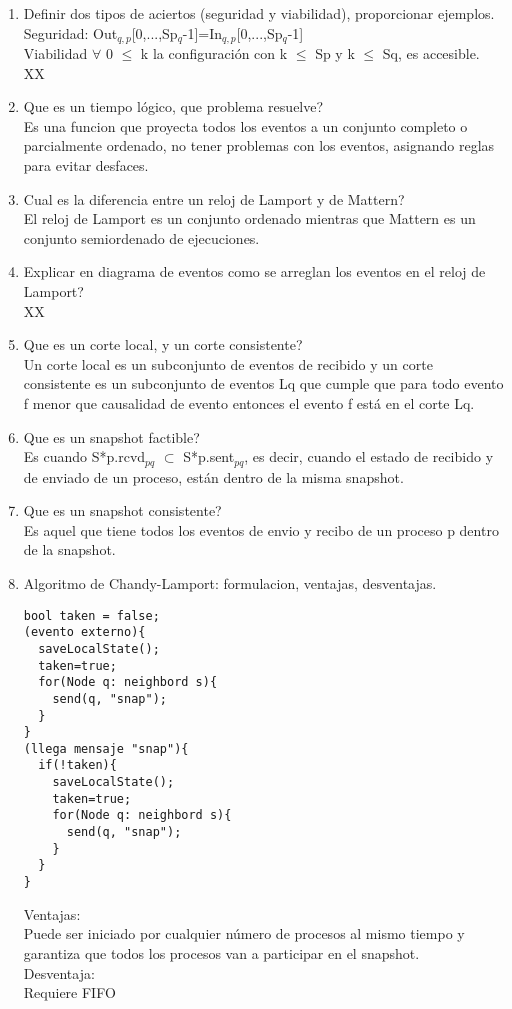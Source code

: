 \documentclass[letterpaper, 12pt]{article}
\begin{document}
\begin{enumerate}
		\item Definir dos tipos de aciertos (seguridad y viabilidad), proporcionar ejemplos.
			\\Seguridad: Out$_{q,p}$[0,...,Sp$_{q}$-1]=In$_{q,p}$[0,...,Sp$_{q}$-1]
			\\Viabilidad $\forall$ 0 $\leq$ k la configuración con k $\leq$ Sp y k $\leq$ Sq, es accesible.
			\\XX
		\item Que es un tiempo lógico, que problema resuelve?
			\\Es una funcion que proyecta todos los eventos a un conjunto completo o parcialmente ordenado, no tener problemas con los eventos, asignando reglas para evitar desfaces.
		\item Cual es la diferencia entre un reloj de Lamport y de Mattern?
			\\ El reloj de Lamport es un conjunto ordenado mientras que Mattern es un conjunto semiordenado de ejecuciones.
		\item Explicar en diagrama de eventos como se arreglan los eventos en el reloj de Lamport?
			\\XX
		\item Que es un corte local, y un corte consistente?
			\\ Un corte local es un subconjunto de eventos de recibido y un corte consistente es un subconjunto de eventos Lq que cumple que para todo evento f menor que causalidad de evento entonces el evento f está en el corte Lq.
		\item Que es un snapshot factible?
			\\Es cuando S*p.rcvd$_{pq}$ $\subset$ S*p.sent$_{pq}$, es decir, cuando el estado de recibido y de enviado de un proceso, están dentro de la misma snapshot.
		\item Que es un snapshot consistente?
			\\Es aquel que tiene todos los eventos de envio y recibo de un proceso p dentro de la snapshot.
		\item Algoritmo de Chandy-Lamport: formulacion, ventajas, desventajas.
			\begin{lstlisting}
bool taken = false;
(evento externo){
  saveLocalState();
  taken=true;
  for(Node q: neighbord s){
    send(q, "snap");  
  }
}			
(llega mensaje "snap"){
  if(!taken){
    saveLocalState();
    taken=true;
    for(Node q: neighbord s){
      send(q, "snap");  
    }      
  }
}
			\end{lstlisting}
Ventajas:
\\ Puede ser iniciado por cualquier número de procesos al mismo tiempo y garantiza que todos los procesos van a participar en el snapshot.
\\ Desventaja:
\\ Requiere FIFO


\end{enumerate}
\end{document}
